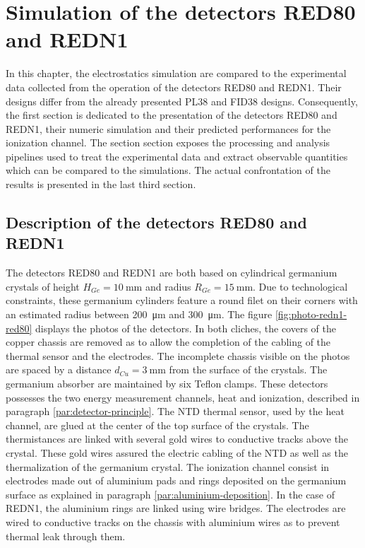 
\chapter{Simulation of the detectors RED80 and REDN1} %

\label{ChapterElectrodesExperimental} %



In this chapter, the electrostatics simulation are compared to the experimental data collected from the operation of the detectors RED80 and REDN1.
Their designs differ from the already presented PL38 and FID38 designs.
Consequently, the first section is dedicated to the presentation of the detectors RED80 and REDN1, their numeric simulation and their predicted performances for the ionization channel.
The section section exposes the processing and analysis pipelines used to treat the experimental data and extract observable quantities which can be compared to the simulations.
The actual confrontation of the results is presented in the last third section.


\section{Description of the detectors RED80 and REDN1}

The detectors RED80 and REDN1 are both based on cylindrical germanium crystals of height $H_{Ge} = \SI{10}{\mm}$ and radius $R_{Ge} = \SI{15}{\mm}$. Due to technological constraints, these germanium cylinders feature a round filet on their corners with an estimated radius between \SI{200}{\micro\metre} and \SI{300}{\micro\metre}. The figure \ref{fig:photo-redn1-red80} displays the photos of the detectors. In both cliches, the covers of the copper chassis are removed as to allow the completion of the cabling of the thermal sensor and the electrodes. The incomplete chassis visible on the photos are spaced by a distance $d_{Cu} = \SI{3}{\mm}$ from the surface of the crystals. The germanium absorber are maintained by six Teflon clamps.
These detectors possesses the two energy measurement channels, heat and ionization, described in paragraph \ref{par:detector-principle}. The NTD thermal sensor, used by the heat channel, are glued at the center of the top surface of the crystals. The thermistances are linked with several gold wires to conductive tracks above the crystal. These gold wires assured the electric cabling of the NTD as well as the thermalization of the germanium crystal. The ionization channel consist in electrodes made out of aluminium pads and rings deposited on the germanium surface as explained in paragraph \ref{par:aluminium-deposition}. In the case of REDN1, the aluminium rings are linked using wire bridges. The electrodes are wired to conductive tracks on the chassis with aluminium wires as to prevent thermal leak through them.

